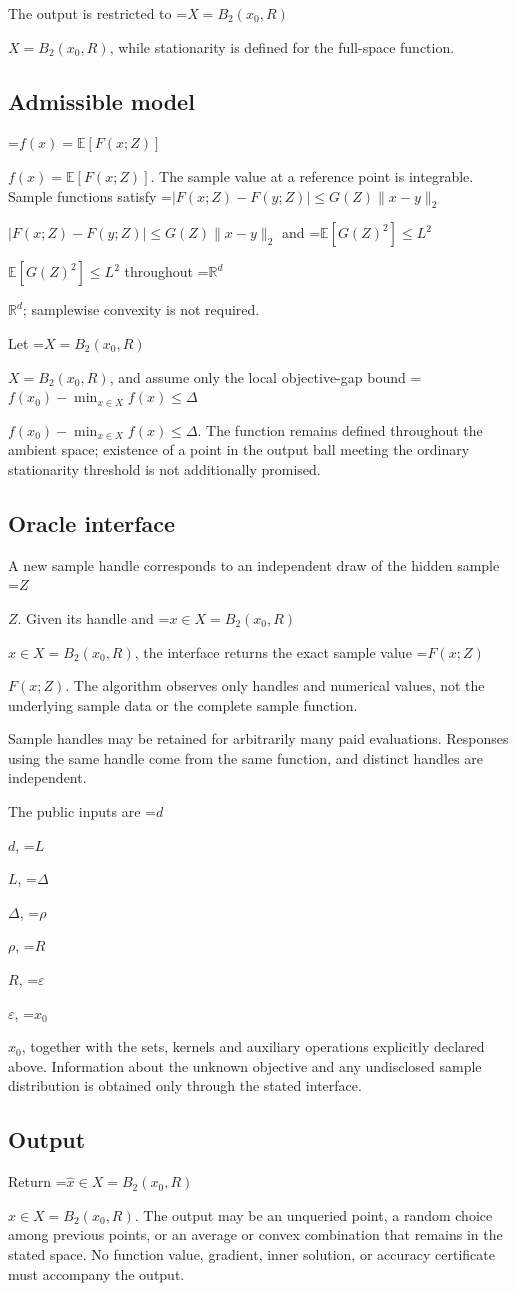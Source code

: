 \documentclass[10pt,a4paper]{article}
\newcommand{\AtlasMath}[1]{\par\begingroup\centering\setbox0=\hbox{$\displaystyle #1$}\ifdim\wd0>1.4\linewidth\typeout{ATLAS WIDE FORMULA: \the\wd0}\fi\ifdim\wd0>\linewidth\resizebox{\linewidth}{!}{\box0}\else\box0\fi\par\endgroup}
\newcommand{\AtlasInlineMath}[1]{\begingroup\setbox0=\hbox{$#1$}\ifdim\wd0>.4\linewidth\endgroup\AtlasMath{#1}\else\endgroup$#1$\fi}
\begin{document}
The output is restricted to \AtlasInlineMath{X=B_2(x_0,R)}, while stationarity is defined for the full-space function.

\subsection{Admissible model}
\AtlasInlineMath{f(x)=\mathbb{E}[F(x;Z)]}. The sample value at a reference point is integrable. Sample functions satisfy \AtlasInlineMath{|F(x;Z)-F(y;Z)|\le G(Z)\|x-y\|_2} and \AtlasInlineMath{\mathbb{E}[G(Z)^2]\le L^2} throughout \AtlasInlineMath{\mathbb{R}^d}; samplewise convexity is not required.

Let \AtlasInlineMath{X=B_2(x_0,R)}, and assume only the local objective-gap bound \AtlasInlineMath{f(x_0)-\min_{x\in X}f(x)\le\Delta}. The function remains defined throughout the ambient space; existence of a point in the output ball meeting the ordinary stationarity threshold is not additionally promised.

\subsection{Oracle interface}
A new sample handle corresponds to an independent draw of the hidden sample \AtlasInlineMath{Z}. Given its handle and \AtlasInlineMath{x\in X=B_2(x_0,R)}, the interface returns the exact sample value \AtlasInlineMath{F(x;Z)}. The algorithm observes only handles and numerical values, not the underlying sample data or the complete sample function.

Sample handles may be retained for arbitrarily many paid evaluations. Responses using the same handle come from the same function, and distinct handles are independent.

The public inputs are \AtlasInlineMath{d}, \AtlasInlineMath{L}, \AtlasInlineMath{\Delta}, \AtlasInlineMath{\rho}, \AtlasInlineMath{R}, \AtlasInlineMath{\varepsilon}, \AtlasInlineMath{x_0}, together with the sets, kernels and auxiliary operations explicitly declared above. Information about the unknown objective and any undisclosed sample distribution is obtained only through the stated interface.

\subsection{Output}
Return \AtlasInlineMath{\widehat{x}\in X=B_2(x_0,R)}. The output may be an unqueried point, a random choice among previous points, or an average or convex combination that remains in the stated space. No function value, gradient, inner solution, or accuracy certificate must accompany the output.
\end{document}
